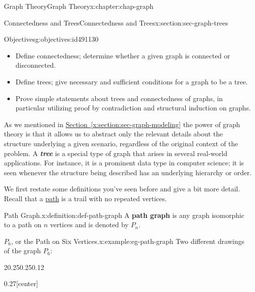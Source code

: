 \documentclass[oneside,10pt,]{book}
\newcommand{\xreffont}{\relax}
\newcommand{\alert}[1]{\textbf{\textit{#1}}}
\newcommand{\terminology}[1]{\textbf{#1}}
\numberwithin{equation}{section}
\begin{document}
\begin{chapterptx}{Graph Theory}{}{Graph Theory}{}{}{x:chapter:chap-graph}
%
%
\typeout{************************************************}
\typeout{************************************************}
%
\begin{sectionptx}{Connectedness and Trees}{}{Connectedness and Trees}{}{}{x:section:sec-graph-trees}
\begin{objectives}{Objectives}{g:objectives:id491130}
%
\begin{itemize}[label=\textbullet]
\item{}Define connectedness; determine whether a given graph is connected or disconnected.%
\item{}Define trees; give necessary and sufficient conditions for a graph to be a tree.%
\item{}Prove simple statements about trees and connectedness of graphs, in particular utilizing proof by contradiction and structural induction on graphs.%
\end{itemize}
\end{objectives}
As we mentioned in \hyperref[x:section:sec-graph-modeling]{Section~{\xreffont\ref{x:section:sec-graph-modeling}}} the power of graph theory is that it allows us to abstract only the relevant details about the structure underlying a given scenario, regardless of the original context of the problem. A \alert{tree} is a special type of graph that arises in several real-world applications. For instance, it is a prominent data type in computer science; it is seen whenever the structure being described has an underlying hierarchy or order.%
\par
We first restate some definitions you've seen before and give a bit more detail. Recall that a \hyperref[x:definition:def-path]{path} is a trail with no repeated vertices.%
\begin{definition}{Path Graph.}{x:definition:def-path-graph}%
A \terminology{path graph} is any graph isomorphic to a path on \(n\) vertices and is denoted by \(P_n\). \label{g:notation:id491185}%
\end{definition}
\begin{example}{\(P_6\), or the Path on Six Vertices.}{x:example:eg-path-graph}%
Two different drawings of the graph \(P_6\):%
\begin{sidebyside}{2}{0.25}{0.25}{0.12}%
\begin{sbspanel}{0.27}[center]%
\end{sbspanel}
\end{sidebyside}
\end{example}
\end{sectionptx}
\end{chapterptx}
\end{document}
